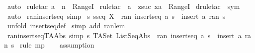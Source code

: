 \begin{isabellebody}
\isamarkupfalse%
\ auto\isanewline
{}\isamarkupfalse%
\ {\isacharparenleft}rule{\isacharunderscore}tac\ a\ {\isacharequal}\ {\isachardoublequoteopen}n{\isachardoublequoteclose}\ \ RangeI{\isacharparenright}\isanewline
{}\isamarkupfalse%
\ {\isacharparenleft}rule{\isacharunderscore}tac\ {\isacharbrackleft}{}{\isacharbrackright}\ a\ {\isacharequal}\ {\isachardoublequoteopen}zsuc\ xa{\isachardoublequoteclose}\ \ RangeI{\isacharparenright}\isanewline
{}\isamarkupfalse%
\ {\isacharparenleft}drule{\isacharunderscore}tac\ {\isacharbrackleft}{}{\isacharbrackright}\ sym{\isacharparenright}\isanewline
{}\isamarkupfalse%
\ auto\isanewline
{}\isamarkupfalse%
%
\endisatagproof
{\isafoldproof}%
%
\isadelimproof
\isanewline
%
\endisadelimproof
\isanewline
{}\isamarkupfalse%
\ ran{\isacharunderscore}insertseq\ {\isacharbrackleft}simp{\isacharbrackright}{\isacharcolon}\ \isanewline
{\isachardoublequoteopen}{\isacharbang}{\isacharbang}s{\isachardot}\ s{\isacharcolon}seq\ X\ {\isacharequal}{\isacharequal}{\isachargreater}\ ran\ {\isacharparenleft}insertseq\ a\ s{\isacharparenright}\ {\isacharequal}\ {\isacharparenleft}insert\ a\ {\isacharparenleft}ran\ s{\isacharparenright}{\isacharparenright}{\isachardoublequoteclose}\isanewline
%
\isadelimproof
%
\endisadelimproof
%
\isatagproof
{}\isamarkupfalse%
\ {\isacharparenleft}unfold\ insertseq{\isacharunderscore}def{\isacharparenright}\isanewline
{}\isamarkupfalse%
\ {\isacharparenleft}simp\ add{\isacharcolon}\ ran{\isacharunderscore}lem{\isacharparenright}\isanewline
{}\isamarkupfalse%
%
\endisatagproof
{\isafoldproof}%
%
\isadelimproof
\isanewline
%
\endisadelimproof
\ \isanewline
{}\isamarkupfalse%
\ ran{\isacharunderscore}insertseq{\isacharunderscore}TAAbs\ {\isacharbrackleft}simp{\isacharbrackright}{\isacharcolon}\ {\isachardoublequoteopen}s{\isacharcolon}\ TASet\ ListSeqAbs\ {\isacharequal}{\isacharequal}{\isachargreater}\ ran\ {\isacharparenleft}insertseq\ a\ s{\isacharparenright}\ {\isacharequal}\ {\isacharparenleft}insert\ a\ {\isacharparenleft}ran\ s{\isacharparenright}{\isacharparenright}{\isachardoublequoteclose}\isanewline
%
\isadelimproof
%
\endisadelimproof
%
\isatagproof
{}\isamarkupfalse%
\ {\isacharparenleft}rule\ mp{\isacharparenright}\isanewline
{}\isamarkupfalse%
\ {}\ \isanewline
{}\isamarkupfalse%
\ {\isacharparenleft}assumption{\isacharparenright}\isanewline

\end{isabellebody}

